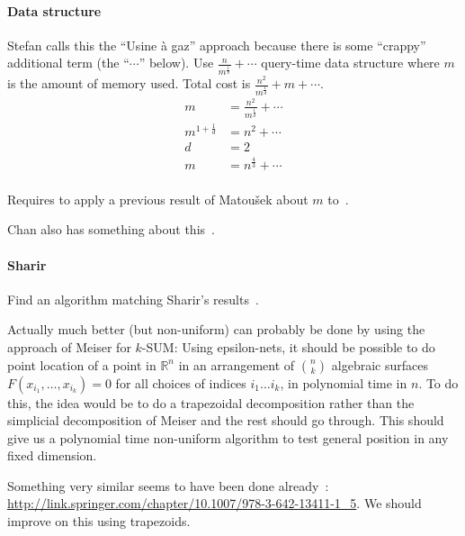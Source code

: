 \paragraph{Data structure}
Stefan calls this the ``Usine à gaz'' approach because there is some ``crappy''
additional term (the ``$\cdots$'' below).
Use $\frac{n}{m^\frac{1}{d}}+\cdots$ query-time data structure where $m$ is the
amount of memory used.
Total cost is $\frac{n^2}{m^\frac{1}{d}}+m + \cdots$.
\begin{align*}
	m &= \frac{n^2}{m^\frac{1}{d}} + \cdots \\
	m^{1+\frac{1}{d}} &= n^2 + \cdots\\
	d &= 2\\
	m &= n^\frac{4}{3} + \cdots\\
\end{align*}

Requires to apply a previous result of Matou\v{s}ek about $m$ to~\cite{AMS13}.

Chan also has something about this~\cite{Ch12}.

\paragraph{Sharir}

Find an algorithm matching Sharir's results~\cite{SSS15}.

\begin{displayquote}
Actually much better (but non-uniform) can probably be done by using
the approach of Meiser for $k$-SUM: Using epsilon-nets, it should be
possible to do point location of a point in $\mathbb{R}^n$ in an arrangement of
$\binom{n}{k}$ algebraic surfaces $F(x_{i_1},\ldots,x_{i_k})=0$ for all choices of
indices $i_1 \ldots i_k$, in polynomial time in $n$. To do this, the idea would be
to do a trapezoidal decomposition rather than the simplicial
decomposition of Meiser and the rest should go through. This should
give us a polynomial time non-uniform algorithm to test general
position in any fixed dimension.
\end{displayquote}

Something very similar seems to have been done already~\cite{G10}:
\url{http://link.springer.com/chapter/10.1007/978-3-642-13411-1\_5}.
We should improve on this using trapezoids.
